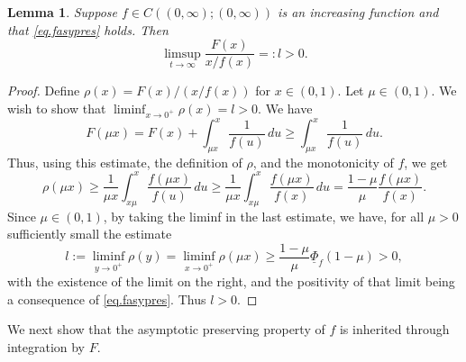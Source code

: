 \documentclass[a4paper,10pt,reqno]{amsart}
\numberwithin{equation}{section}
\newtheorem{lemma}{Lemma}
\theoremstyle{definition}
\theoremstyle{remark}
\DeclareMathOperator{\1}{\mathbbm 1}
\begin{document}
	
	\begin{lemma}  \label{lem.importfmuapFinv}
		Suppose $f\in C((0,\infty);(0,\infty))$ is an increasing function and that \eqref{eq.fasypres} holds. Then 
		\[
		\limsup_{t\to\infty} \frac{F(x)}{x/f(x)}=:l>0. 
		\]
	\end{lemma}
	\begin{proof}
		Define $\rho(x)=F(x)/(x/f(x))$ for $x\in (0,1)$. Let $\mu\in (0,1)$. We wish to show that $\liminf_{x\to 0^+} \rho(x)=l>0$. 
		We have 
		\[
		F(\mu x)=F(x)+\int_{\mu x}^x \frac{1}{f(u)}\,du\geq \int_{\mu x}^x \frac{1}{f(u)}\,du. 
		\]
		Thus, using this estimate, the definition of $\rho$, and the monotonicity of $f$, we get  
		\[
		\rho(\mu x) \geq \frac{1}{\mu x}\int_{x\mu}^x \frac{f(\mu x)}{f(u)}\,du\geq  \frac{1}{\mu x}\int_{x\mu}^x \frac{f(\mu x)}{f(x)}\,du = \frac{1-\mu}{\mu}\frac{f(\mu x)}{f(x)}.
		\]
		Since $\mu\in (0,1)$, by taking the liminf in the last estimate, we have, for all $\mu>0$ sufficiently small the estimate 
		\[
		l:=\liminf_{y\to 0^+} \rho(y)=\liminf_{x\to 0^+} \rho(\mu x)
		\geq \frac{1-\mu}{\mu}\underline{\Phi}_f(1-\mu)>0,
		\]
		with the existence of the limit on the right, and the positivity of that limit being a consequence of \eqref{eq.fasypres}. Thus $l>0$. 
	\end{proof}
	
	We next show that the asymptotic preserving property of $f$ is inherited through integration by $F$. 
	
\end{document}
